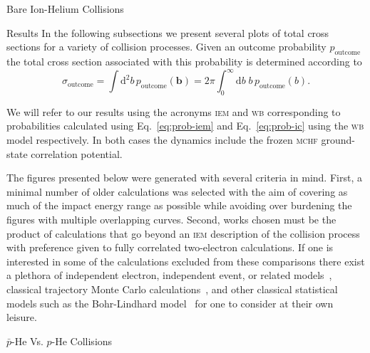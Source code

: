\documentclass[letterpaper, 11 pt]{report}
\begin{document}
\begin{chapter}{Bare Ion-Helium Collisions \label{chap:p-he2p-he}}
\begin{section}{Results \label{sec:phe2p-res}}
      In the following subsections we present several plots of total cross sections for a variety of
      collision processes. Given an outcome probability $p_\mathrm{outcome}$ the total cross section
      associated with this probability is determined according to
      \begin{equation} \label{eq:tcs}
         \sigma_\mathrm{outcome} = \int \mathrm{d}^2 b \, p_\mathrm{outcome} (\mathbf{b})
         = 2 \pi \int^\infty_0 \mathrm{d}b \; b \, p_\mathrm{outcome} (b).
      \end{equation}

      We will refer to our results using the acronyms \textsc{iem} and \textsc{wb} corresponding to
      probabilities calculated using Eq.~\eqref{eq:prob-iem} and Eq.~\eqref{eq:prob-ic} using the
      \textsc{wb} model respectively. In both cases the dynamics include the frozen \textsc{mchf}
      ground-state correlation potential.

      The figures presented below were generated with several criteria in mind. First, a minimal number
      of older calculations was selected with the aim of covering as much of the impact energy range as
      possible while avoiding over burdening the figures with multiple overlapping curves. Second, works
      chosen must be the product of calculations that go beyond an \textsc{iem} description of the
      collision process with preference given to fully correlated two-electron calculations. If one is
      interested in some of the calculations excluded from these comparisons there exist a plethora of
      independent electron, independent event, or related models~\cite{SLD-83, DMR-84, SLD-85, GM-86,
      CM-87, GM-87, JLF-89, DC-90, DC-91a, DC-91b, DG-91, SKG-91, SL-91, Kuang-92, MLC-93, CM-94,
      CSR-95, BDM-96, MBGH-97, McCartney-97, Mccartney-99, GAMRF-02, GFS-02, AMRF-04, BLMC-04, FRBJG-06,
      FJG-07, GIFK-08, ZK-09, G-11, LFG-11, GG-12a}, classical trajectory Monte Carlo
      calculations~\cite{ZM-85, OWM-86, MO-87, WO-88, MS-89, Cohen-96, TH-96, MMTH-02, DAKW-04, GEP-09},
      and other classical statistical models such as the Bohr-Lindhard model~\cite{DYC-08,Ding-12} for
      one to consider at their own leisure.

      \begin{subsection}{ \texorpdfstring{$\bar{p}$}{pbar}-He Vs. \texorpdfstring{$p$}{p}-He Collisions
                         \label{sec:pbarhe-res}}


\end{subsection}
\end{section}
\end{chapter}
\end{document}
